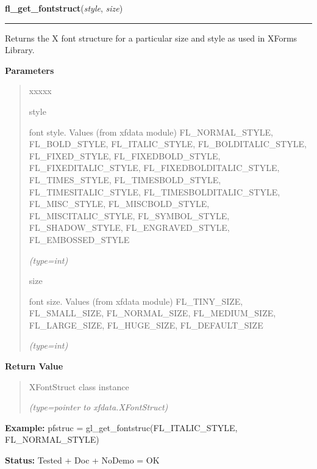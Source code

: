 \hspace{.8\funcindent}\begin{boxedminipage}{\funcwidth}

    \raggedright \textbf{fl\_get\_fontstruct}(\textit{style}, \textit{size})

    \vspace{-1.5ex}

    \rule{\textwidth}{0.5\fboxrule}
\setlength{\parskip}{2ex}
    Returns the X font structure for a particular size and style as used in
    XForms Library.

\setlength{\parskip}{1ex}
      \textbf{Parameters}
      \vspace{-1ex}

      \begin{quote}
        \begin{Ventry}{xxxxx}

          \item[style]

          font style. Values (from xfdata module) FL\_NORMAL\_STYLE, 
          FL\_BOLD\_STYLE, FL\_ITALIC\_STYLE, FL\_BOLDITALIC\_STYLE, 
          FL\_FIXED\_STYLE, FL\_FIXEDBOLD\_STYLE, FL\_FIXEDITALIC\_STYLE, 
          FL\_FIXEDBOLDITALIC\_STYLE, FL\_TIMES\_STYLE, 
          FL\_TIMESBOLD\_STYLE, FL\_TIMESITALIC\_STYLE, 
          FL\_TIMESBOLDITALIC\_STYLE, FL\_MISC\_STYLE, FL\_MISCBOLD\_STYLE,
          FL\_MISCITALIC\_STYLE, FL\_SYMBOL\_STYLE, FL\_SHADOW\_STYLE, 
          FL\_ENGRAVED\_STYLE, FL\_EMBOSSED\_STYLE

            {\it (type=int)}

          \item[size]

          font size. Values (from xfdata module) FL\_TINY\_SIZE, 
          FL\_SMALL\_SIZE, FL\_NORMAL\_SIZE, FL\_MEDIUM\_SIZE, 
          FL\_LARGE\_SIZE, FL\_HUGE\_SIZE, FL\_DEFAULT\_SIZE

            {\it (type=int)}

        \end{Ventry}

      \end{quote}

      \textbf{Return Value}
    \vspace{-1ex}

      \begin{quote}
      XFontStruct class instance

      {\it (type=pointer to xfdata.XFontStruct)}

      \end{quote}

\textbf{Example:} pfstruc = gl\_get\_fontstruc(FL\_ITALIC\_STYLE, FL\_NORMAL\_STYLE)



\textbf{Status:} Tested + Doc + NoDemo = OK



    \end{boxedminipage}

